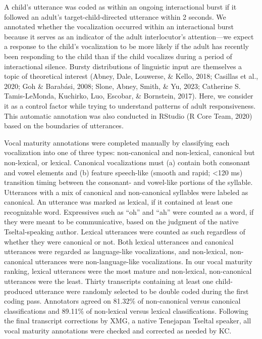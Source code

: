 \documentclass[
  man]{apa6}
\begin{document}
A child's utterance was coded as within an ongoing interactional burst if it followed an adult's target-child-directed utterance within 2 seconds. We annotated whether the vocalization occurred within an interactional burst because it serves as an indicator of the adult interlocutor's attention---we expect a response to the child's vocalization to be more likely if the adult has recently been responding to the child than if the child vocalizes during a period of interactional silence. Bursty distributions of linguistic input are themselves a topic of theoretical interest (Abney, Dale, Louwerse, \& Kello, 2018; Casillas et al., 2020; Goh \& Barabási, 2008; Slone, Abney, Smith, \& Yu, 2023; Catherine S. Tamis-LeMonda, Kuchirko, Luo, Escobar, \& Bornstein, 2017). Here, we consider it as a control factor while trying to understand patterns of adult responsiveness. This automatic annotation was also conducted in RStudio (R Core Team, 2020) based on the boundaries of utterances.

Vocal maturity annotations were completed manually by classifying each vocalization into one of three types: non-canonical and non-lexical, canonical but non-lexical, or lexical. Canonical vocalizations must (a) contain both consonant and vowel elements and (b) feature speech-like (smooth and rapid; \textless120 ms) transition timing between the consonant- and vowel-like portions of the syllable. Utterances with a mix of canonical and non-canonical syllables were labeled as canonical. An utterance was marked as lexical, if it contained at least one recognizable word. Expressives such as ``oh'' and ``ah'' were counted as a word, if they were meant to be communicative, based on the judgment of the native Tseltal-speaking author. Lexical utterances were counted as such regardless of whether they were canonical or not. Both lexical utterances and canonical utterances were regarded as language-like vocalizations, and non-lexical, non-canonical utterances were non-language-like vocalizations. In our vocal maturity ranking, lexical utterances were the most mature and non-lexical, non-canonical utterances were the least. Thirty transcripts containing at least one child-produced utterance were randomly selected to be double coded during the first coding pass. Annotators agreed on 81.32\% of non-canonical versus canonical classifications and 89.11\% of non-lexical versus lexical classifications. Following the final transcript corrections by XMG, a native Tenejapan Tseltal speaker, all vocal maturity annotations were checked and corrected as needed by KC.
\end{document}
